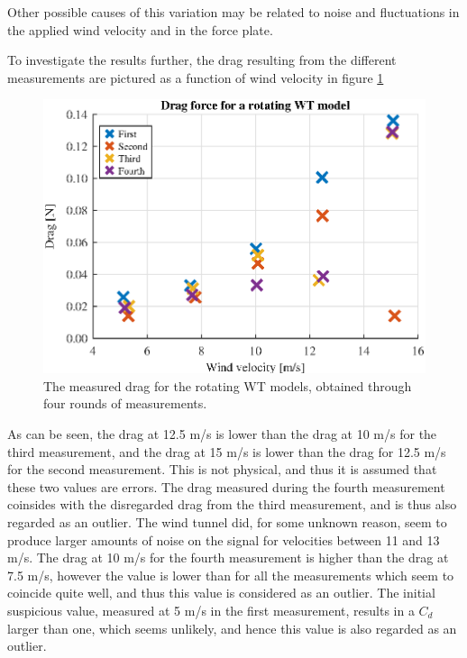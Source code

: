 Other possible causes of this variation may be related to noise and fluctuations in the applied wind velocity and in the force plate. 

To investigate the results further, the drag resulting from the different measurements are pictured as a function of wind velocity in figure \ref{fig:RotationalDrag}


\begin{figure}[h!]
    \centering
    \includegraphics[width=\linewidth]{0_Images/RotationalDrag.eps}
    \caption{The measured drag for the rotating WT models, obtained through four rounds of measurements.}
    \label{fig:RotationalDrag}
\end{figure}

As can be seen, the drag at 12.5 m/s is lower than the drag at 10 m/s for the third measurement, and the drag at 15 m/s is lower than the drag for 12.5 m/s for the second measurement. This is not physical, and thus it is assumed that these two values are errors. The drag measured during the fourth measurement coinsides with the disregarded drag from the third measurement, and is thus also regarded as an outlier. The wind tunnel did, for some unknown reason, seem to produce larger amounts of noise on the signal for velocities between 11 and 13 m/s. The drag at 10 m/s for the fourth measurement is higher than the drag at 7.5 m/s, however the value is lower than for all the measurements which seem to coincide quite well, and thus this value is considered as an outlier. The initial suspicious value, measured at 5 m/s in the first measurement, results in a $C_d$ larger than one, which seems unlikely, and hence this value is also regarded as an outlier. 

